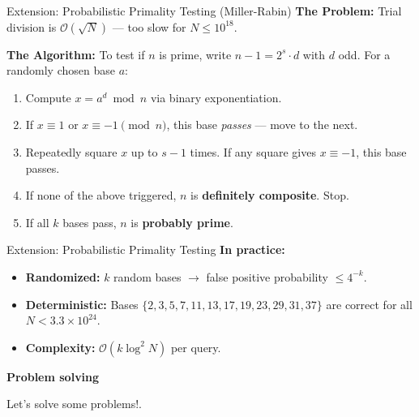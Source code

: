 \documentclass[aspectratio=169]{beamer}
\begin{document}
\begin{frame}{Extension: Probabilistic Primality Testing (Miller-Rabin)}
    \textbf{The Problem:} Trial division is $\mathcal{O}(\sqrt{N})$ --- too slow for $N \le 10^{18}$.

    \textbf{The Algorithm:} To test if $n$ is prime, write $n - 1 = 2^s \cdot d$ with $d$ odd.
    For a randomly chosen base $a$:
    \begin{enumerate}
        \item Compute $x = a^d \bmod n$ via binary exponentiation.
        \item If $x \equiv 1$ or $x \equiv -1 \pmod{n}$, this base \textit{passes} --- move to the next.
        \item Repeatedly square $x$ up to $s - 1$ times. If any square gives $x \equiv -1$, this base passes.
        \item If none of the above triggered, $n$ is \textbf{definitely composite}. Stop.
        \item If all $k$ bases pass, $n$ is \textbf{probably prime}.
    \end{enumerate}
\end{frame}
\begin{frame}{Extension: Probabilistic Primality Testing}
    \vspace{0.2cm}
    \textbf{In practice:}
    \begin{itemize}
        \item \textbf{Randomized:} $k$ random bases $\rightarrow$ false positive probability $\le 4^{-k}$.
        \item \textbf{Deterministic:} Bases $\{2, 3, 5, 7, 11, 13, 17, 19, 23, 29, 31, 37\}$
        are correct for all $N < 3.3 \times 10^{24}$.
        \item \textbf{Complexity:} $\mathcal{O}(k \log^2 N)$ per query.
    \end{itemize}
\end{frame}

\begin{frame}[plain]
    \vfill
    \centering
    {\Large\bfseries Problem solving}
    
    \vspace{0.5cm}
    \textcolor{kcpc-muted}{Let's solve some problems!.}
    \vfill
\end{frame}
\end{document}
